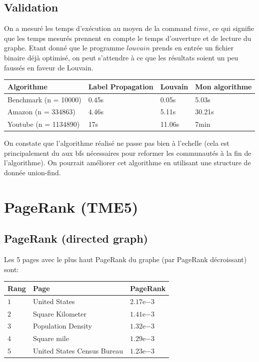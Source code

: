 \documentclass[a4paper]{report}
\begin{document}
\section{Validation}

On a mesuré les temps d'exécution au moyen de la command $time$, ce qui signifie que les temps mesurés prennent en compte le temps d'ouverture et de lecture du graphe. Etant donné que le programme $louvain$ prends en entrée un fichier binaire déjà optimisé, on peut s'attendre à ce que les résultats soient un peu faussés en faveur de Louvain.

\begin{center}
  \begin{tabular}{|l|l|l|l|}
    \hline
    Algorithme & Label Propagation & Louvain & Mon algorithme\\
    \hline
    Benchmark (n = 10000) & 0.45s & 0.05s & 5.03s\\
    Amazon (n = 334863) & 4.46s & 5.11s & 30.21s\\
    Youtube (n = 1134890) & 17s & 11.06s & 7min\\
    \hline
  \end{tabular}
\end{center}

On constate que l'algorithme réalisé ne passe pas bien à l'echelle (cela est principalement du aux bfs nécessaires pour reformer les communautés à la fin de l'algorithme). On pourrait améliorer cet algorithme en utilisant une structure de donnée union-find.

\chapter{PageRank (TME5)}

\section{PageRank (directed graph)}

Les 5 pages avec le plus haut PageRank du graphe (par PageRank décroissant) sont:

\begin{center}
  \begin{tabular}{|l|l|l|}
    \hline
    Rang & Page & PageRank\\
    \hline
    $1$ & United States & $2.17\mathrm{e}{-3}$\\
    $2$ & Square Kilometer & $1.41\mathrm{e}{-3}$\\
    $3$ & Population Density & $1.32\mathrm{e}{-3}$\\
    $4$ & Square mile & $1.29\mathrm{e}{-3}$\\
    $5$ & United States Census Bureau & $1.23\mathrm{e}{-3}$\\
    \hline
  \end{tabular}
\end{center}
\end{document}
